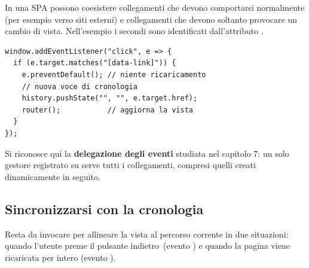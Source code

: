 In una SPA possono coesistere collegamenti che devono comportarsi normalmente
(per esempio verso siti esterni) e collegamenti che devono soltanto provocare un
cambio di vista. Nell'esempio i secondi sono identificati dall'attributo
.

\begin{affianco}[0.46][c]
\begin{lstlisting}[style=js, name=main.js]
window.addEventListener("click", e => {
  if (e.target.matches("[data-link]")) {
    e.preventDefault(); // niente ricaricamento
    // nuova voce di cronologia
    history.pushState("", "", e.target.href);
    router();           // aggiorna la vista
  }
});
\end{lstlisting}
\risultato
\begin{immagine}
\end{immagine}
\end{affianco}

Si riconosce qui la \textbf{delegazione degli eventi} studiata nel capitolo 7:
un solo gestore registrato su  serve tutti i collegamenti, compresi
quelli creati dinamicamente in seguito.

\subsection{Sincronizzarsi con la cronologia}

Resta da invocare  per allineare la vista al percorso corrente
in due situazioni: quando l'utente preme il pulsante \guillemotleft indietro\guillemotright\ (evento
) e quando la pagina viene ricaricata per intero (evento
).

